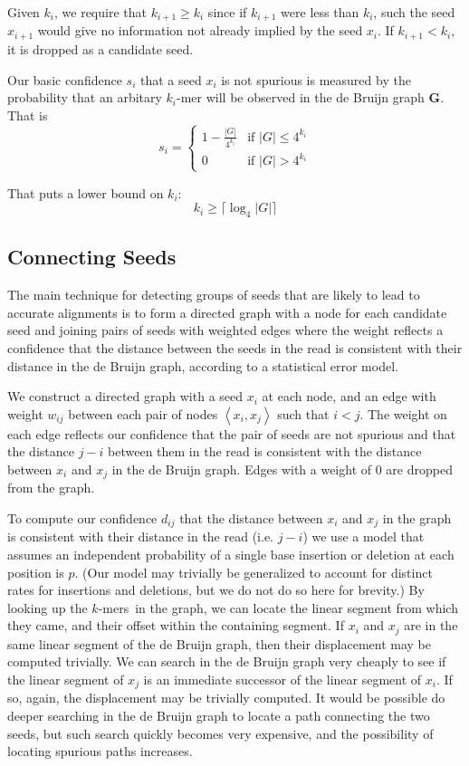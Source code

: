 \documentclass[twocolumn]{article}
\newcommand{\kmers}{$k$-mers}
\begin{document}
Given $k_i$, we require that $k_{i+1} \ge k_i$ since if $k_{i+1}$ were less than $k_i$,
such the seed $x_{i+1}$ would give no information not already implied by the seed $x_i$.
If $k_{i+1} < k_i$, it is dropped as a candidate seed.

Our basic confidence $s_i$ that a seed $x_i$ is not spurious is measured by the probability that an arbitary $k_i$-mer
will be observed in the de Bruijn graph $\mathbf{G}$.
That is
$$
    s_i = \left\{
        \begin{array}{ll}
            1 - \frac{\left|G\right|}{4^{k_i}}  & \textrm{if } \left|G\right| \le 4^{k_i} \\
            0                                   & \textrm{if } \left|G\right| > 4^{k_i}
        \end{array}
          \right.
$$

That puts a lower bound on $k_i$:
$$
k_i \ge \lceil \log_4 \left|G\right| \rceil
$$

\subsection{Connecting Seeds}
\label{sec:graph}

The main technique for detecting groups of seeds that are likely to lead to accurate alignments
is to form a directed graph with a node for each candidate seed and joining pairs of seeds with weighted
edges where the weight reflects a confidence that the distance between the seeds in the read is consistent
with their distance in the de Bruijn graph, according to a statistical error model.

We construct a directed graph with a seed $x_i$ at each node, and
an edge with weight $w_{ij}$ between each pair of nodes
$\left<x_i,x_j\right>$ such that $i < j$.  The weight on each edge
reflects our confidence that the pair of seeds are not spurious and
that the distance $j - i$ between them in the read is consistent
with the distance between $x_i$ and $x_j$ in the de Bruijn graph.
Edges with a weight of 0 are dropped from the graph.

To compute our confidence $d_{ij}$ that the distance between
$x_i$ and $x_j$ in the graph is consistent with their distance in the read
(i.e. $j - i$) we use a model that assumes an independent probability of a
single base insertion or deletion at each position is $p$.
(Our model may trivially be generalized to account for distinct rates
for insertions and deletions, but we do not do so here for brevity.)
By looking up the \kmers\ in the graph, we can locate the linear segment
from which they came, and their offset within the containing segment. If
$x_i$ and $x_j$ are in the same linear segment of the de Bruijn graph,
then their displacement
may be computed trivially. We can search in the de Bruijn graph very
cheaply to see if the linear segment of $x_j$ is an immediate successor
of the linear segment of $x_i$. If so, again, the displacement may be
trivially computed. 
It would be possible do deeper searching in the de Bruijn graph to locate
a path connecting the two seeds, but such search quickly becomes very expensive,
and the possibility of locating spurious paths increases.
\end{document}
